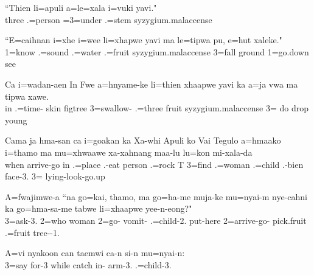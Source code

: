 \ea
\gll ``Thien li=apuli a=le=xala i=vuki yavi."\\ three .=person =3=under .=stem syzygium.malaccense\\ \glt {}
\z

\ea
\gll ``E=caihnan i=xhe i=wee li=xhapwe yavi ma le=tipwa pu, e=hut xaleke."\\ 1=know .=sound .=water .=fruit syzygium.malaccense  3=fall ground 1=go.down see\\ \glt  {}
\z

\ea
\gll Ca i=wadan-aen In Fwe a=hnyame-ke li=thien xhaapwe yavi ka a=ja vwa ma tipwa xawe.\\ in .=time- skin figtree 3=swallow- .=three fruit syzygium.malaccense  3= do  drop young\\ \glt  {}
\z

\ea
\gll Cama ja hma-san ca i=goakan ka Xa-whi Apuli ko Vai Tegulo a=hmaako i=thamo ma mu=xhwaawe xa-xahnang maa-lu lu=kon mi-xala-da\\ when  arrive-go in .=place  .-eat person  .=rock T 3=find .=woman  .=child .-bien face-3. 3= lying-look-go.up\\ \glt  {}
\z

\ea
\gll A=fwajimwe-a ``na go=kai, thamo, ma go=ha-me muja-ke mu=nyai-m nye-cahni ka go=hma-sa-me tabwe li=xhaapwe yee-n-eong?"\\ 3=ask-3.  2=who woman  2=go- vomit- .=child-2. put-here  2=arrive-go- pick.fruit .=fruit tree--1.\\ \glt {}
\z

\ea
\gll A=vi nyakoon can taemwi ca-n si-n mu=nyai-n:\\ 3=say for-3 while catch in- arm-3. .=child-3.\\ \glt  {}
\z

